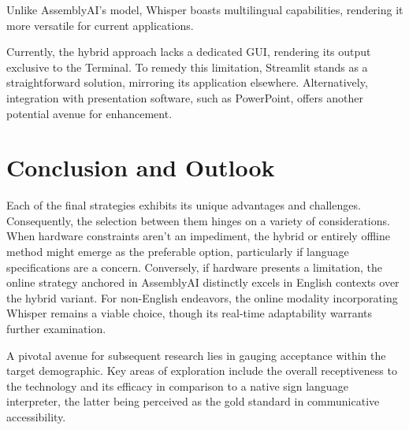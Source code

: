 \documentclass[12pt]{article}
\begin{document}
Unlike AssemblyAI's model, Whisper boasts multilingual capabilities, rendering it more versatile for current applications.

Currently, the hybrid approach lacks a dedicated GUI, rendering its output exclusive to the Terminal. To remedy this limitation, Streamlit stands as a straightforward solution, mirroring its application elsewhere. Alternatively, integration with presentation software, such as PowerPoint, offers another potential avenue for enhancement.

\section{Conclusion and Outlook}
\label{sec:conclusion}

Each of the final strategies exhibits its unique advantages and challenges. Consequently, the selection between them hinges on a variety of considerations. When hardware constraints aren't an impediment, the hybrid or entirely offline method might emerge as the preferable option, particularly if language specifications are a concern. Conversely, if hardware presents a limitation, the online strategy anchored in AssemblyAI distinctly excels in English contexts over the hybrid variant. For non-English endeavors, the online modality incorporating Whisper remains a viable choice, though its real-time adaptability warrants further examination.

A pivotal avenue for subsequent research lies in gauging acceptance within the target demographic. Key areas of exploration include the overall receptiveness to the technology and its efficacy in comparison to a native sign language interpreter, the latter being perceived as the gold standard in communicative accessibility.

\newpage

\nocite{*}



\end{document}
